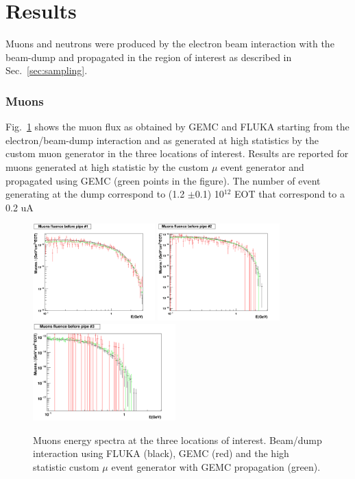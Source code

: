 \section{Results}\label{sec:results}

Muons and neutrons were produced by the electron beam interaction with the beam-dump and propagated in the region of interest as described in  Sec.~\ref{sec:sampling}.


\subsubsection{Muons}
Fig.~\ref{fig:mu-comp} shows the muon flux  as obtained by GEMC and FLUKA starting from the electron/beam-dump interaction and as generated at high statistics by the custom muon generator in the  three locations of interest. Results are reported for muons generated at high statistic by the custom $\mu$ event generator and propagated using GEMC (green points in the figure).
The number of event generating at the dump correspond to  (1.2 $\pm$0.1) 10$^{12}$ EOT that correspond to a  0.2 uA 
\begin{figure}[h!] 
\center
\includegraphics[width=4.7cm]{figs/comparisonMuonsPipe1_1D.pdf}
\includegraphics[width=4.7cm]{figs/comparisonMuonsPipe2_1D.pdf}
\includegraphics[width=5.5cm]{figs/comparisonMuonsPipe3_1D.pdf}
\caption{Muons energy spectra at the three locations of interest. Beam/dump interaction using  FLUKA (black), GEMC (red) and the high statistic custom $\mu$ event generator with GEMC propagation (green).}
\label{fig:mu-comp}
\end{figure}

